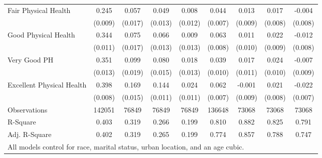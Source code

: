 \begin{table}
\begin{tabular}{l*{8}{c}}
Fair Physical Health&       0.245\sym{***}&       0.057\sym{***}&       0.049\sym{***}&       0.008         &       0.044\sym{***}&       0.013         &       0.017\sym{*}  &      -0.004         \\
                    &     (0.009)         &     (0.017)         &     (0.013)         &     (0.012)         &     (0.007)         &     (0.009)         &     (0.008)         &     (0.008)         \\
Good Physical Health&       0.344\sym{***}&       0.075\sym{***}&       0.066\sym{***}&       0.009         &       0.063\sym{***}&       0.011         &       0.022\sym{*}  &      -0.012         \\
                    &     (0.011)         &     (0.017)         &     (0.013)         &     (0.013)         &     (0.008)         &     (0.010)         &     (0.009)         &     (0.008)         \\
Very Good PH        &       0.351\sym{***}&       0.099\sym{***}&       0.080\sym{***}&       0.018         &       0.039\sym{***}&       0.017         &       0.024\sym{*}  &      -0.007         \\
                    &     (0.013)         &     (0.019)         &     (0.015)         &     (0.013)         &     (0.010)         &     (0.011)         &     (0.010)         &     (0.009)         \\
Excellent Physical Health&       0.398\sym{***}&       0.169\sym{***}&       0.144\sym{***}&       0.024\sym{*}  &       0.062\sym{***}&      -0.001         &       0.021\sym{**} &      -0.022\sym{**} \\
                    &     (0.008)         &     (0.015)         &     (0.011)         &     (0.011)         &     (0.007)         &     (0.009)         &     (0.008)         &     (0.007)         \\
\midrule
Observations        &      142051         &       76849         &       76849         &       76849         &      136648         &       73068         &       73068         &       73068         \\
R-Square            &       0.403         &       0.319         &       0.266         &       0.199         &       0.810         &       0.882         &       0.825         &       0.791         \\
Adj. R-Square       &       0.402         &       0.319         &       0.265         &       0.199         &       0.774         &       0.857         &       0.788         &       0.747         \\
\bottomrule
\multicolumn{9}{l}{\small{All models control for race, marital status, urban location, and an age cubic.}} \\
\end{tabular}
\end{table}
